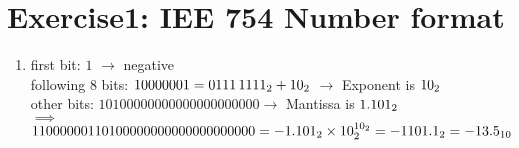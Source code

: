 \documentclass{gadsescript}
\begin{document}
\maketitle
\section*{\textbf{Exercise1:} IEE 754 Number format}
\begin{enumerate}[label=\alph*)]
	\item first bit: $ 1 $ $ \rightarrow $ negative\\
		following $ 8 $ bits: $ 10000001 = \binnum[8]{0111 1111} + \binnum{10} $ $ \rightarrow $ Exponent is $ \binnum{10} $\\
		other bits: $ {10100000000000000000000} \rightarrow $ Mantissa is $ \binnum{1.101} $\\
		$\implies$ $11000000110100000000000000000000 = - \binnum{1.101} \times \binnum{10}^{\binnum{10}} = -\binnum{1101.1} = -\decnum{13.5} $
\end{enumerate}
\end{document}
